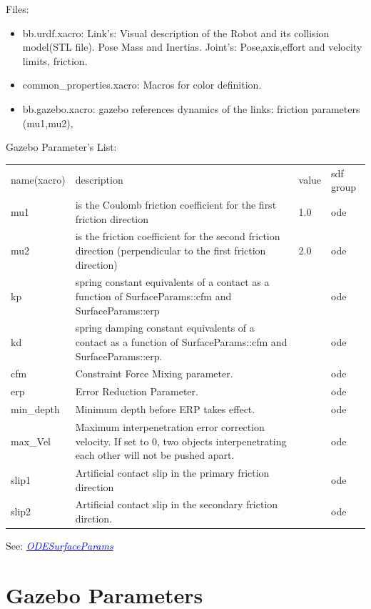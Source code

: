 \documentclass[twoside,colorback,accentcolor=tud4c,11pt]{tudreport}
\newcommand{\mylink}[2] {	\href{#1}{	\textit{\textcolor{blue}{#2}}}}
\begin{document}
Files:
\begin{itemize}
	\item bb.urdf.xacro: Link's: Visual description of the Robot and its collision model(STL file). Pose Mass and Inertias. Joint's: Pose,axis,effort and velocity limits, friction.
	\item common\_properties.xacro: Macros for color definition.
	\item bb.gazebo.xacro: gazebo references dynamics of the links: friction parameters (mu1,mu2), 
\end{itemize}

Gazebo Parameter's List:\\
\begin{tabular}{l L{12cm} l l}
	name(xacro)&description&value&sdf group\\
	mu1&is the Coulomb friction coefficient for the first friction direction&1.0&ode\\
	mu2& is the friction coefficient for the second friction direction (perpendicular to the first friction direction)&2.0&ode\\
	kp&spring constant equivalents of a contact as a function of SurfaceParams::cfm and SurfaceParams::erp & &ode \\
	kd&spring damping constant equivalents of a contact as a function of SurfaceParams::cfm and SurfaceParams::erp.   & &ode \\
	cfm&Constraint Force Mixing parameter.& &ode \\
	erp&Error Reduction Parameter.& &ode \\
	min\_depth&Minimum depth before ERP takes effect.   & &ode \\
	max\_Vel& Maximum interpenetration error correction velocity.
	If set to 0, two objects interpenetrating each other will not be pushed apart.  & &ode \\
	slip1&Artificial contact slip in the primary friction direction  & &ode \\
	slip2&Artificial contact slip in the secondary friction dirction.& &ode \\
\end{tabular}

See: \mylink{http://osrf-distributions.s3.amazonaws.com/gazebo/api/dev/classgazebo_1_1physics_1_1ODESurfaceParams.html}{ODESurfaceParams}

\section{Gazebo Parameters}
\end{document}
